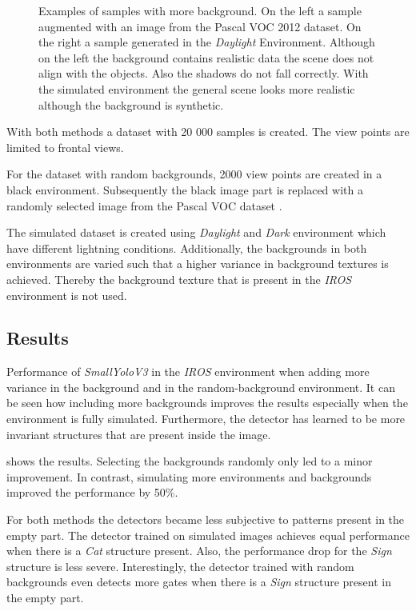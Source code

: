 \begin{figure}
\begin{minipage}{0.3\textwidth}
	\end{minipage}
	\caption{Examples of samples with more background. On the left a sample augmented with an image from the Pascal VOC 2012 dataset. On the right a sample generated in the \textit{Daylight} Environment. Although on the left the background contains realistic data the scene does not align with the objects. Also the shadows do not fall correctly. With the simulated environment the general scene looks more realistic although the background is synthetic.}
	\label{fig:sim_vs_voc}
\end{figure}

With both methods a dataset with 20 000 samples is created. The view points are limited to frontal views.

For the dataset with random backgrounds, 2000 view points are created in a black environment. Subsequently the black image part is replaced with a randomly selected image from the Pascal VOC dataset \cite{Everingham2010}.

The simulated dataset is created using \textit{Daylight} and \textit{Dark} environment which have different lightning conditions. Additionally, the backgrounds in both environments are varied such that a higher variance in background textures is achieved. Thereby the background texture that is present in the \textit{IROS} environment is not used.


\subsection{Results}

\begin{table}[hbtp]
	\centering
	
	\caption{Performance of \textit{SmallYoloV3} in the \textit{IROS} environment when adding more variance in the background and in the random-background environment. It can be seen how including more backgrounds improves the results especially when the environment is fully simulated. Furthermore, the detector has learned to be more invariant structures that are present inside the image.}
	\label{tab:sim_vs_voc}
\end{table}

 shows the results. Selecting the backgrounds randomly only led to a minor improvement. In contrast, simulating more environments and backgrounds improved the performance by 50\%.

For both methods the detectors became less subjective to patterns present in the empty part. The detector trained on simulated images achieves equal performance when there is a \textit{Cat} structure present. Also, the performance drop for the \textit{Sign} structure is less severe. Interestingly, the detector trained with random backgrounds even detects more gates when there is a \textit{Sign} structure present in the empty part.

